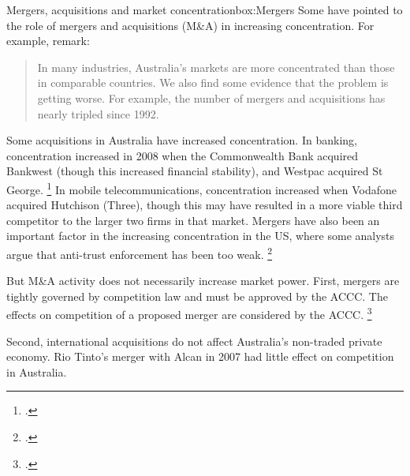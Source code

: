 

\begin{bigbox}{Mergers, acquisitions and market concentration}{box:Mergers}
Some have pointed to the role of mergers and acquisitions (M\&A) in increasing concentration. For example, \textcite{Leigh-Triggs-Huff-2017} remark:

\begin{quote}
    In many industries, Australia's markets are more concentrated than those in comparable countries. We also find some evidence that the problem is getting worse. For example, the number of mergers and acquisitions has nearly tripled since 1992.
\end{quote}


Some acquisitions in Australia have increased concentration. In banking, concentration increased in 2008 when the Commonwealth Bank acquired Bankwest (though this increased financial stability), and Westpac acquired St George.%
\footcite{APRA2017MonthlyBankingStatistics}
In mobile telecommunications, concentration increased when Vodafone acquired Hutchison (Three), though this may have resulted in a more viable third competitor to the larger two firms in that market. Mergers have also been an important factor in the increasing concentration in the US, where some analysts argue that anti-trust enforcement has been too weak.%
\footcite{antitrustpopulism}

But M\&A activity does not necessarily increase market power.
First, mergers are tightly governed by competition law and must be approved by the ACCC\@. The effects on competition of a proposed merger are considered by the ACCC\@.%
\footcite{ACCC_mergerguidelines}

Second, international acquisitions do not affect Australia's non-traded private economy.
Rio Tinto's merger with Alcan in 2007 had little effect on competition in Australia.


\end{bigbox}
